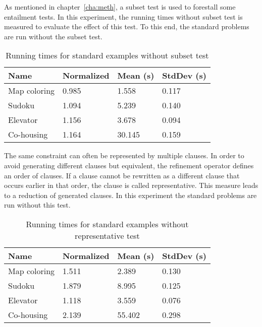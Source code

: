 \begin{experiment}
	As mentioned in chapter~\ref{cha:meth}, a subset test is used to forestall some entailment tests.
	In this experiment, the running times without subset test is measured to evaluate the effect of this test.
	To this end, the standard problems are run without the subset test.

	\begin{table}[!htp]
		\begin{tabularx}{\textwidth}{XXXX}
			\textbf{Name}	& \textbf{Normalized}	& \textbf{Mean (s)}	& \textbf{StdDev (s)} \\
			\toprule
			Map coloring 	& 0.985					& 1.558				& 0.117 \\
			Sudoku 			& 1.094					& 5.239				& 0.140 \\
			Elevator 		& 1.156					& 3.678 			& 0.094 \\
			Co-housing 		& 1.164					& 30.145			& 0.159
		\end{tabularx}
		\label{tbl:exp_speed_no_subset}
		\caption{Running times for standard examples without subset test}
	\end{table}
\end{experiment}

\begin{experiment}
	The same constraint can often be represented by multiple clauses.
	In order to avoid generating different clauses but equivalent, the refinement operator defines an order of clauses.
	If a clause cannot be rewritten as a different clause that occurs earlier in that order, the clause is called representative.
	This measure leads to a reduction of generated clauses.
	In this experiment the standard problems are run without this test.

	\begin{table}[!htp]
		\begin{tabularx}{\textwidth}{XXXX}
			\textbf{Name}	& \textbf{Normalized}	& \textbf{Mean (s)}	& \textbf{StdDev (s)} \\
			\toprule
			Map coloring 	& 1.511					& 2.389				& 0.130 \\
			Sudoku 			& 1.879					& 8.995				& 0.125 \\
			Elevator 		& 1.118					& 3.559 			& 0.076 \\
			Co-housing 		& 2.139					& 55.402			& 0.298
		\end{tabularx}
		\label{tbl:exp_speed_no_representative}
		\caption{Running times for standard examples without representative test}
	\end{table}

\end{experiment}

